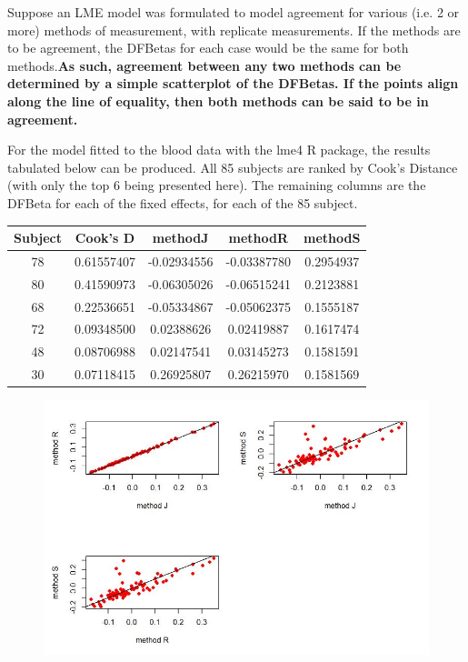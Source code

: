 \documentclass[12pt, a4paper]{report}
\theoremstyle{plain}
\theoremstyle{definition}
\theoremstyle{remark}
\begin{document}
	Suppose an LME model was formulated to model agreement for various (i.e. 2 or more) methods of measurement, with replicate measurements. If the methods are to be agreement, the DFBetas for each case would be the same for both methods.\textbf{As such, agreement between any two methods can be determined by a simple scatterplot of the DFBetas. If the points align along the line of equality, then both methods can be said to be in agreement.}
	
	For the model fitted to the blood data with the lme4 R package, the results tabulated below can be produced. All 85 subjects are ranked by Cook's Distance (with only the top 6 being presented here). The remaining columns are the DFBeta for each of the fixed effects, for each of the 85 subject.
	\begin{center}
		\begin{tabular}{|c|c|c|c|c|} \hline
			Subject &    Cook's D  &    methodJ  &   methodR  & methodS \\ \hline \hline
			78 & 0.61557407 & -0.02934556 & -0.03387780 & 0.2954937  \\ \hline
			80 & 0.41590973 & -0.06305026 & -0.06515241 & 0.2123881  \\ \hline
			68 & 0.22536651 & -0.05334867 & -0.05062375 & 0.1555187  \\ \hline
			72 & 0.09348500  & 0.02388626  & 0.02419887 & 0.1617474  \\ \hline
			48 & 0.08706988  & 0.02147541  & 0.03145273 & 0.1581591  \\ \hline
			30 & 0.07118415  & 0.26925807  & 0.26215970 & 0.1581569  \\ \hline
		\end{tabular}
	\end{center}
	
	\begin{figure}[h!]
		\centering
		\includegraphics[width=0.9\linewidth]{images/04-DFbetaplots}
	\end{figure}
	
\end{document}

